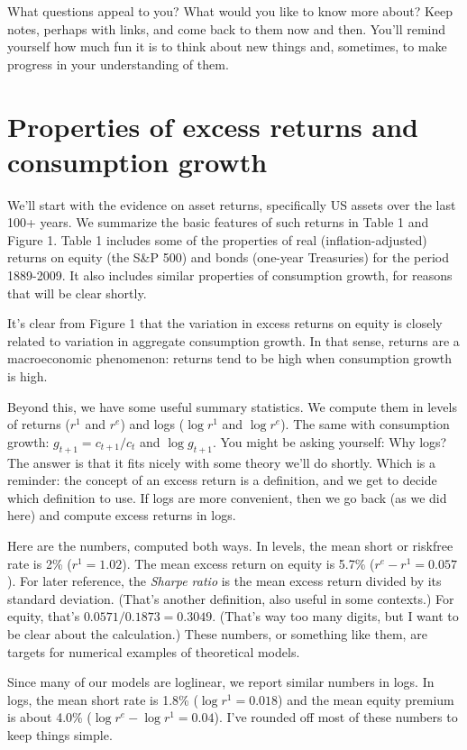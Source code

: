 \documentclass[11pt]{article}
\begin{document}
%
What questions appeal to you?
What would you like to know more about?
Keep notes, perhaps with links,
and come back to them now and then.
You'll remind yourself how much fun it is to think about new things
and, sometimes, to make progress in your understanding of them.


\section{Properties of excess returns and consumption growth}

We'll start with the evidence on asset returns, 
specifically US assets over the last 100+ years.
We summarize the basic features of such returns in Table 1 and Figure 1.
Table 1 includes some of the properties of
real (inflation-adjusted) returns on equity (the S\&P 500)
and bonds (one-year Treasuries) for the period 1889-2009.
It also includes similar properties of consumption growth,
for reasons that will be clear shortly.

It's clear from Figure 1 that the variation in excess returns on equity
is closely related to variation in aggregate consumption growth.
In that sense, returns are a macroeconomic phenomenon:
returns tend to be high when consumption growth is high.

Beyond this, we have some useful summary statistics.
We compute them in levels of returns ($r^1$ and $r^e$)
and logs ($\log r^1$ and $\log r^e$).
The same with consumption growth:  $g_{t+1} = c_{t+1}/c_t$
and $\log g_{t+1}$.
You might be asking yourself:  Why logs?  
The answer is that it fits nicely with some theory we'll do shortly. 
Which is a reminder:  the concept of an excess return is a definition,
and we get to decide which definition to use.  
If logs are more convenient, then we go back (as we did here)
and compute excess returns in logs.  

Here are the numbers, computed both ways.  
In levels, the mean short or riskfree rate is 2\% ($r^1 = 1.02$).
The mean excess return on equity is 5.7\% ($r^e - r^1 = 0.057$).
For later reference, the {\it Sharpe ratio\/}
is the mean excess return divided by its standard deviation.
(That's another definition, also useful in some contexts.) 
For equity, that's $ 0.0571/0.1873 = 0.3049$.
(That's way too many digits, but I want to be clear about the calculation.)
These numbers, or something like them, are targets for numerical examples
of theoretical models.


Since many of our models are loglinear, we report similar numbers in logs.
In logs, the mean short rate is 1.8\% ($\log r^1 = 0.018$)
and the mean equity premium is about 4.0\% ($\log r^e - \log r^1 = 0.04$).
I've rounded off most of these numbers to keep things simple.
\end{document}
